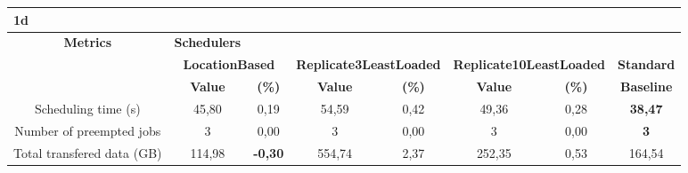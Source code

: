

\begin{table}[]
\begin{tabular}{cccccccc}
\multicolumn{8}{l}{1d}                                                                                                                                                                                                                                                                                                            \\ \hline
\multicolumn{1}{|c|}{\textbf{Metrics}}           & \multicolumn{1}{c|}{\textbf{Schedulers}} & \multicolumn{1}{c|}{\textbf{}}      & \multicolumn{1}{c|}{}               & \multicolumn{1}{c|}{}               & \multicolumn{1}{c|}{}               & \multicolumn{1}{c|}{}              & \multicolumn{1}{c|}{}                  \\ \hline
\multicolumn{1}{|c|}{\textbf{}}                  & \multicolumn{2}{c|}{\textbf{LocationBased}}                                    & \multicolumn{2}{c|}{\textbf{Replicate3LeastLoaded}}                       & \multicolumn{2}{c|}{\textbf{Replicate10LeastLoaded}}                     & \multicolumn{1}{c|}{\textbf{Standard}} \\ \hline
\multicolumn{1}{|c|}{}                           & \multicolumn{1}{c|}{\textbf{Value}}      & \multicolumn{1}{c|}{\textbf{(\%)}}  & \multicolumn{1}{c|}{\textbf{Value}} & \multicolumn{1}{c|}{\textbf{(\%)}}  & \multicolumn{1}{c|}{\textbf{Value}} & \multicolumn{1}{c|}{\textbf{(\%)}} & \multicolumn{1}{c|}{\textbf{Baseline}} \\ \hline
\multicolumn{1}{|c|}{Scheduling time (s)}        & \multicolumn{1}{c|}{45,80}               & \multicolumn{1}{c|}{0,19}           & \multicolumn{1}{c|}{54,59}          & \multicolumn{1}{c|}{0,42}           & \multicolumn{1}{c|}{49,36}          & \multicolumn{1}{c|}{0,28}          & \multicolumn{1}{c|}{\textbf{38,47}}    \\ \hline
\multicolumn{1}{|c|}{Number of preempted jobs}   & \multicolumn{1}{c|}{3}                   & \multicolumn{1}{c|}{0,00}           & \multicolumn{1}{c|}{3}              & \multicolumn{1}{c|}{0,00}           & \multicolumn{1}{c|}{3}              & \multicolumn{1}{c|}{0,00}          & \multicolumn{1}{c|}{\textbf{3}}        \\ \hline
\multicolumn{1}{|c|}{Total transfered data (GB)} & \multicolumn{1}{c|}{114,98}              & \multicolumn{1}{c|}{\textbf{-0,30}} & \multicolumn{1}{c|}{554,74}         & \multicolumn{1}{c|}{2,37}           & \multicolumn{1}{c|}{252,35}         & \multicolumn{1}{c|}{0,53}          & \multicolumn{1}{c|}{164,54}            \\ \hline

\end{tabular}
\end{table}

